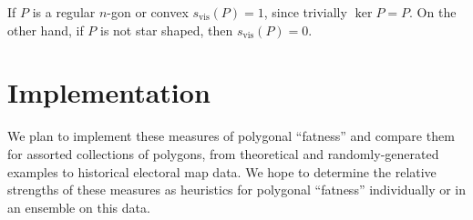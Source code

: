 \documentclass{article}
\theoremstyle{definition}
\begin{document}
If $P$ is a regular $n$-gon or convex $s_{\textrm{vis}}(P) = 1$, since trivially
$\ker P = P$. On the other hand, if $P$ is not star shaped, then
$s_{\textrm{vis}}(P) = 0$.


\section{Implementation}

We plan to implement these measures of polygonal ``fatness'' and compare them
for assorted collections of polygons, from theoretical and
randomly-generated examples to historical electoral map data. We hope to
determine the relative strengths of these measures as heuristics for polygonal
``fatness'' individually or in an ensemble on this data. 
\end{document}
